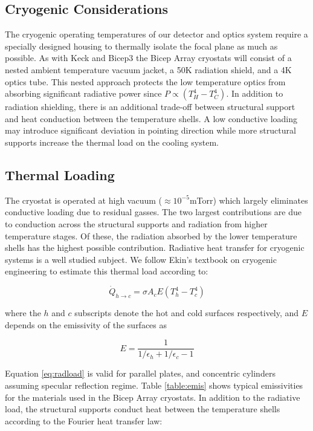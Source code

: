 \documentclass[12pt]{article}
\begin{document}
\subsection{Cryogenic Considerations}
The cryogenic operating temperatures of our detector and optics system require
a specially designed housing to thermally isolate the focal plane as much as
possible. As with Keck and Bicep3 the Bicep Array cryostats will consist of a
nested ambient temperature vacuum jacket, a 50K radiation shield, and a 4K
optics tube. This nested approach protects the low temperature optics
from absorbing significant radiative power since $P\propto (T_{H}^4-T_{C}^4)$.
In addition to radiation shielding, there is an additional trade-off between
structural support and heat conduction between the temperature shells. A low
conductive loading may introduce significant deviation in pointing direction
while more structural supports increase the thermal load on the cooling
system. 

\subsection{Thermal Loading}
The cryostat is operated at high vacuum ($\approx 10^{-5}$mTorr) which largely
eliminates conductive loading due to residual gasses. The two largest
contributions are due to conduction across the structural supports and
radiation from higher temperature stages. Of these, the radiation absorbed by
the lower temperature shells has the highest possible contribution. Radiative
heat transfer for cryogenic systems is a well studied subject. We follow
Ekin's textbook on cryogenic engineering to estimate this thermal load
according to:

\begin{equation}
	\dot{Q}_{h\rightarrow c}=\sigma A_{c} E (T_{h}^4 - T_{c}^4)
	\label{eq:radload}
\end{equation}

where the $h$ and $c$ subscripts denote the hot and cold surfaces
respectively, and $E$ depends on the emissivity of the surfaces as

\begin{equation}
	E=\frac{1}{1/\epsilon _h + 1/\epsilon _c - 1}
\end{equation}

Equation \ref{eq:radload} is valid for parallel plates, and concentric
cylinders assuming specular reflection regime. Table \ref{table:emis} shows
typical emissivities for the materials used in the Bicep Array cryostats. In
addition to the radiative load, the structural supports conduct heat between
the temperature shells according to the Fourier heat transfer law:
\end{document}

